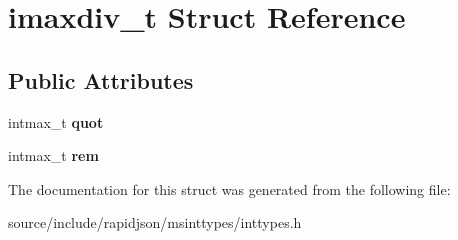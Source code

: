 \hypertarget{structimaxdiv__t}{}\section{imaxdiv\+\_\+t Struct Reference}
\label{structimaxdiv__t}
\subsection*{Public Attributes}
\begin{DoxyCompactItemize}
\item 
\hypertarget{structimaxdiv__t_a9339814cbb7610c72fb7d30c6573b393}{}intmax\+\_\+t {\bfseries quot}\label{structimaxdiv__t_a9339814cbb7610c72fb7d30c6573b393}

\item 
\hypertarget{structimaxdiv__t_a6c9701ad10bff81edae7ff679cae7850}{}intmax\+\_\+t {\bfseries rem}\label{structimaxdiv__t_a6c9701ad10bff81edae7ff679cae7850}

\end{DoxyCompactItemize}


The documentation for this struct was generated from the following file\+:\begin{DoxyCompactItemize}
\item 
source/include/rapidjson/msinttypes/inttypes.\+h\end{DoxyCompactItemize}

